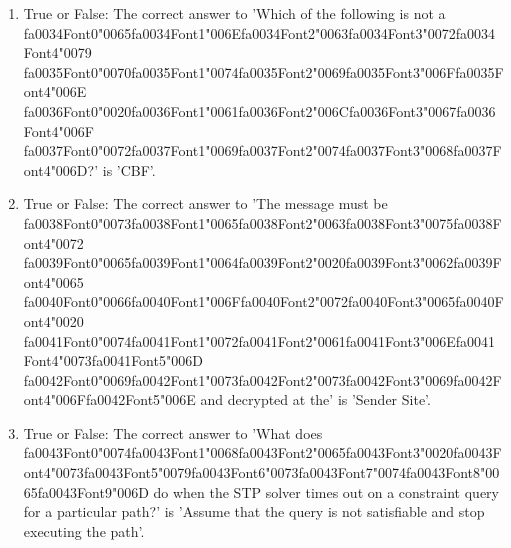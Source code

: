 \documentclass[12pt]{article}
\begin{document}
\begin{enumerate}[label=\arabic*.]
\item True or False: The correct answer to 'Which of the following is not a {\csname fa0034Font0\endcsname\char"0065}{\csname fa0034Font1\endcsname\char"006E}{\csname fa0034Font2\endcsname\char"0063}{\csname fa0034Font3\endcsname\char"0072}{\csname fa0034Font4\endcsname\char"0079} {\csname fa0035Font0\endcsname\char"0070}{\csname fa0035Font1\endcsname\char"0074}{\csname fa0035Font2\endcsname\char"0069}{\csname fa0035Font3\endcsname\char"006F}{\csname fa0035Font4\endcsname\char"006E} {\csname fa0036Font0\endcsname\char"0020}{\csname fa0036Font1\endcsname\char"0061}{\csname fa0036Font2\endcsname\char"006C}{\csname fa0036Font3\endcsname\char"0067}{\csname fa0036Font4\endcsname\char"006F} {\csname fa0037Font0\endcsname\char"0072}{\csname fa0037Font1\endcsname\char"0069}{\csname fa0037Font2\endcsname\char"0074}{\csname fa0037Font3\endcsname\char"0068}{\csname fa0037Font4\endcsname\char"006D}?' is 'CBF'.
\item True or False: The correct answer to 'The message must be {\csname fa0038Font0\endcsname\char"0073}{\csname fa0038Font1\endcsname\char"0065}{\csname fa0038Font2\endcsname\char"0063}{\csname fa0038Font3\endcsname\char"0075}{\csname fa0038Font4\endcsname\char"0072} {\csname fa0039Font0\endcsname\char"0065}{\csname fa0039Font1\endcsname\char"0064}{\csname fa0039Font2\endcsname\char"0020}{\csname fa0039Font3\endcsname\char"0062}{\csname fa0039Font4\endcsname\char"0065} {\csname fa0040Font0\endcsname\char"0066}{\csname fa0040Font1\endcsname\char"006F}{\csname fa0040Font2\endcsname\char"0072}{\csname fa0040Font3\endcsname\char"0065}{\csname fa0040Font4\endcsname\char"0020} {\csname fa0041Font0\endcsname\char"0074}{\csname fa0041Font1\endcsname\char"0072}{\csname fa0041Font2\endcsname\char"0061}{\csname fa0041Font3\endcsname\char"006E}{\csname fa0041Font4\endcsname\char"0073}{\csname fa0041Font5\endcsname\char"006D} {\csname fa0042Font0\endcsname\char"0069}{\csname fa0042Font1\endcsname\char"0073}{\csname fa0042Font2\endcsname\char"0073}{\csname fa0042Font3\endcsname\char"0069}{\csname fa0042Font4\endcsname\char"006F}{\csname fa0042Font5\endcsname\char"006E} and decrypted at the' is 'Sender Site'.
\item True or False: The correct answer to 'What does {\csname fa0043Font0\endcsname\char"0074}{\csname fa0043Font1\endcsname\char"0068}{\csname fa0043Font2\endcsname\char"0065}{\csname fa0043Font3\endcsname\char"0020}{\csname fa0043Font4\endcsname\char"0073}{\csname fa0043Font5\endcsname\char"0079}{\csname fa0043Font6\endcsname\char"0073}{\csname fa0043Font7\endcsname\char"0074}{\csname fa0043Font8\endcsname\char"0065}{\csname fa0043Font9\endcsname\char"006D} do when the STP solver times out on a constraint query for a particular path?' is 'Assume that the query is not satisfiable and stop executing the path'.
\end{enumerate}
\end{document}
